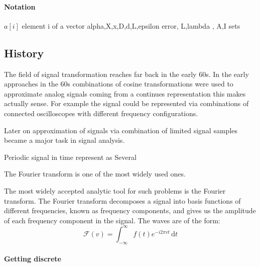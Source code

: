 
\paragraph{Notation}
$a[i]$ element i of a vector
alpha,X,x,D,d,L,epsilon error, L,lambda , A,I sets


\subsection{History}
\label{sec:history}
The field of signal transformation reaches far back in the early 60s.
\cite{Rubinstein2010}
In the early approaches in the 60s combinations of cosine 
transformations were used to approximate analog signals coming from a continues
representation this makes actually sense. For example the signal could be
represented via combinations of connected oscilloscopes with different frequency
configurations. 

Later on approximation of signals via combination of limited signal samples
became a major task in signal analysis. 

Periodic signal in time represent as 
Several 

The Fourier transform is one of the most widely used ones.

The most widely accepted analytic tool for such problems is the Fourier
transform. The Fourier transform decomposes a signal into basis functions of
different frequencies, known as frequency components, and gives us the amplitude
of each frequency component in the signal. The waves are of the form:
\begin{equation*}
\mathcal{F}\left(v\right) = \int_{-\infty}^{\infty} \! f(t)e^{-i2\pi vt} \,
\mathrm{d}t
\end{equation*}

\paragraph{Getting discrete}

